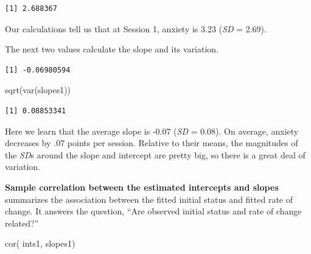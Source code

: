 \documentclass[
  english,
]{book}
\newenvironment{Shaded}{\begin{snugshade}}{\end{snugshade}}
\newcommand{\AttributeTok}[1]{\textcolor[rgb]{0.77,0.63,0.00}{#1}}
\newcommand{\CommentTok}[1]{\textcolor[rgb]{0.56,0.35,0.01}{\textit{#1}}}
\newcommand{\ConstantTok}[1]{\textcolor[rgb]{0.00,0.00,0.00}{#1}}
\newcommand{\ControlFlowTok}[1]{\textcolor[rgb]{0.13,0.29,0.53}{\textbf{#1}}}
\newcommand{\DecValTok}[1]{\textcolor[rgb]{0.00,0.00,0.81}{#1}}
\newcommand{\FunctionTok}[1]{\textcolor[rgb]{0.00,0.00,0.00}{#1}}
\newcommand{\NormalTok}[1]{#1}
\newcommand{\OtherTok}[1]{\textcolor[rgb]{0.56,0.35,0.01}{#1}}
\newcommand{\SpecialCharTok}[1]{\textcolor[rgb]{0.00,0.00,0.00}{#1}}
\begin{document}
\begin{verbatim}
[1] 2.688367
\end{verbatim}

Our calculations tell us that at Session 1, anxiety is 3.23 (\emph{SD} = 2.69).

The next two values calculate the slope and its variation.

\begin{Shaded}
\end{Shaded}

\begin{verbatim}
[1] -0.06980594
\end{verbatim}

\begin{Shaded}
\begin{Highlighting}[]
\FunctionTok{sqrt}\NormalTok{(}\FunctionTok{var}\NormalTok{(slopes1))}
\end{Highlighting}
\end{Shaded}

\begin{verbatim}
[1] 0.08853341
\end{verbatim}

Here we learn that the average slope is -0.07 (\emph{SD} = 0.08). On average, anxiety decreases by .07 points per session. Relative to their means, the magnitudes of the \emph{SD}s around the slope and intercept are pretty big, so there is a great deal of variation.

\textbf{Sample correlation between the estimated intercepts and slopes} summarizes the association between the fitted initial status and fitted rate of change. It answers the question, ``Are observed initial status and rate of change related?''

\begin{Shaded}
\begin{Highlighting}[]
\FunctionTok{cor}\NormalTok{( ints1, slopes1)}
\end{Highlighting}
\end{Shaded}
\end{document}
